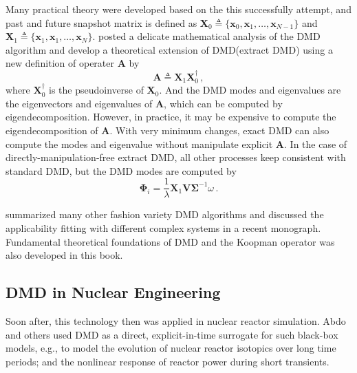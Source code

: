 Many practical theory were developed based on the this successfully attempt, and past and future snapshot matrix is defined as $\mathbf{X}_0 \triangleq \{\mathbf{x}_0, \mathbf{x}_1, \ldots, \mathbf{x}_{N-1} \}$ and $\mathbf{X}_1 \triangleq \{\mathbf{x}_1, \mathbf{x}_1, \ldots, \mathbf{x}_{N} \} $. 
\citet{tu_dynamic_2014} posted a delicate mathematical analysis of the DMD algorithm and develop a theoretical extension of DMD(extract DMD) using a new definition of operater $\mathbf{A}$ by    
\begin{equation}
 \mathbf{A}\triangleq \mathbf{X}_1  \mathbf{X}_0^{\dagger}\, ,
 \label{eq:exact_dmd}
\end{equation}
where $\mathbf{X}_0^{\dagger}$ is the pseudoinverse of $\mathbf{X}_0$. And the DMD modes and
eigenvalues are the eigenvectors and eigenvalues of $\mathbf{A}$, which can be computed by eigendecomposition. However, in practice, it may be expensive to compute the eigendecomposition of $\mathbf{A}$. With very minimum changes, exact DMD can also compute the modes and eigenvalue without manipulate explicit $\mathbf{A}$. In the case of directly-manipulation-free extract DMD, all other processes keep consistent with standard DMD, but the DMD modes are computed by 
\begin{equation}
 \mathbf{\Phi}_i = \frac{1}{\lambda} \mathbf{X}_1 \mathbf{V} \mathbf{\Sigma}^{-1} \omega \, .
 \label{eq:exact_dmd_free}
\end{equation}

\citet{kutz_dynamic_2016} summarized many other fashion variety DMD algorithms and discussed the applicability fitting with different complex systems in a recent monograph.
Fundamental theoretical foundations of DMD and the Koopman operator was also developed in this book.

\subsection{DMD in Nuclear Engineering}
Soon after, this technology then was applied in nuclear reactor simulation. 
Abdo and others used DMD as a direct, explicit-in-time surrogate for such black-box models, e.g., to model the evolution of nuclear reactor isotopics over long time periods; and the nonlinear response of reactor power during short transients.\cite{abdo_data-driven_2018}\cite{abdo_modeling_2019}\cite{elzohery2018comparison}

